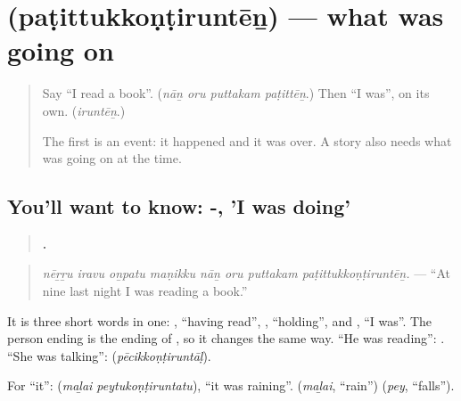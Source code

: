 \section[\texorpdfstring{\ta{படித்துக்கொண்டிருந்தேன்} (paṭittukkoṇṭiruntēṉ)}{படித்துக்கொண்டிருந்தேன் (paṭittukkoṇṭiruntēṉ)}]{ (paṭittukkoṇṭiruntēṉ) — what was going on}

\label{lesson:TA-C284-patittukkontirunten}



\begin{quote}
Say \textquotedblleft{}I read a book\textquotedblright{}. (\emph{nāṉ oru puttakam paṭittēṉ}.) Then \textquotedblleft{}I was\textquotedblright{}, on its own. (\emph{iruntēṉ}.)

The first is an event: it happened and it was over. A story also needs what was going on at the time.
\end{quote}

\subsection*{You'll want to know: -, 'I was doing'}
\begin{quote}
\textbf{       .}
\end{quote}

\begin{quote}
\emph{nēṟṟu iravu oṉpatu maṇikku nāṉ oru puttakam paṭittukkoṇṭiruntēṉ.} — \textquotedblleft{}At nine last night I was reading a book.\textquotedblright{}
\end{quote}

It is three short words in one: \textbf{}, \textquotedblleft{}having read\textquotedblright{}, \textbf{}, \textquotedblleft{}holding\textquotedblright{}, and \textbf{}, \textquotedblleft{}I was\textquotedblright{}. The person ending is the ending of \textbf{}, so it changes the same way. \textquotedblleft{}He was reading\textquotedblright{}: \textbf{} \textbf{}. \textquotedblleft{}She was talking\textquotedblright{}: \textbf{} \textbf{} (\emph{pēcikkoṇṭiruntāḷ}).

For \textquotedblleft{}it\textquotedblright{}: \textbf{ } (\emph{maḻai peytukoṇṭiruntatu}), \textquotedblleft{}it was raining\textquotedblright{}. \textbf{} (\emph{maḻai}, \textquotedblleft{}rain\textquotedblright{}) \textbf{} (\emph{pey}, \textquotedblleft{}falls\textquotedblright{}).


